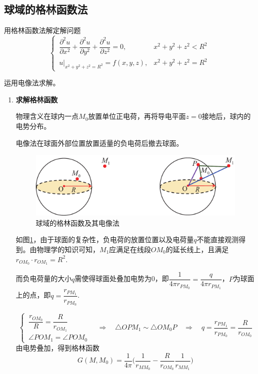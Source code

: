 \subsection{球域的格林函数法}
用格林函数法解定解问题
\begin{equation}
	\begin{cases}
		\, \dfrac{\partial^2 u}{\partial x^2} + \dfrac{\partial^2 u}{\partial y^2} + \dfrac{\partial^2 u}{\partial z^2} = 0, & x^2+y^2+z^2 < R^2\\[0.5em]
		\, u\big|_{x^2 + y^2 + z^2=R^2} = f(x,y,z),& x^2 + y^2 + z^2=R^2
	\end{cases}
\end{equation}

\solve 运用电像法求解。
\begin{enumerate}[\textbf{步骤} 1 ]
	\item \textbf{求解格林函数}
	
	物理含义\quad 在球内一点$M_0$放置单位正电荷，再将导电平面$z=0$接地后，球内的电势分布。
	
	电像法\quad 在球面外部位置放置适量的负电荷后撤去球面。
	\vspace*{0.5em}
	\begin{figure}[!htb]
		\centering
		\includegraphics[width=0.8\linewidth]{pic/格林球域.pdf}
		\caption{球域的格林函数及其电像法}
		\label{格林球域}
	\end{figure}
	\vspace*{-0.5em}
	
	如图\ref{格林球域}，由于球面的复杂性，负电荷的放置位置以及电荷量$q$不能直接观测得到。由物理学的知识可知，$M_1$应满足在线段$OM_0$的延长线上，且满足$r_{OM_0}\cdot r_{OM_1} = R^2$.
	
	而负电荷量的大小$q$需使得球面处叠加电势为0，即$\dfrac{1}{4 \pi r_{PM_0}} = \dfrac{q}{4\pi r_{PM_1}}$，$P$为球面上的点，即$q = \dfrac{r_{PM_1}}{r_{PM_0}}$.
	
	\begin{equation}
		\begin{cases}
			\, \dfrac{r_{OM_0}}{R} = \dfrac{R}{r_{OM_1}}\\
			\, \angle POM_1 = \angle POM_0
		\end{cases}
		\quad \Rightarrow \quad 
		\triangle OPM_1 \sim \triangle OM_0P \quad \Rightarrow \quad 
		q = \dfrac{r_{PM_1}}{r_{PM_0}} = \dfrac{R}{r_{OM_0}}
	\end{equation}
	由电势叠加，得到格林函数
	\begin{equation}
		G(M,M_0) = \dfrac{1}{4\pi} \Bigg(\dfrac{1}{r_{MM_0}}- \dfrac{R}{r_{OM_0}}\dfrac{1}{r_{MM_1}} \Bigg)
	\end{equation}
	

\end{enumerate}
